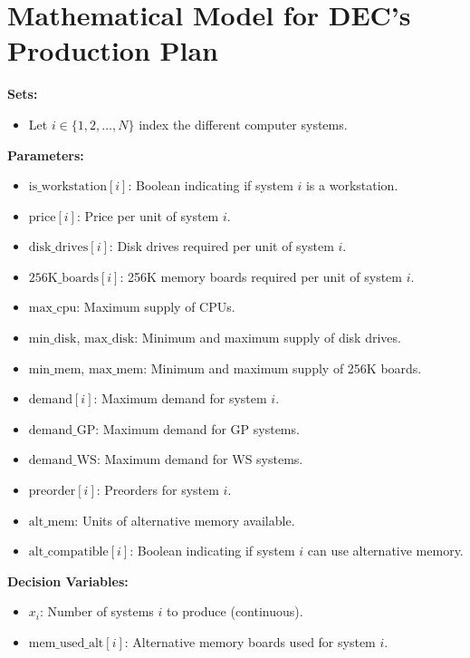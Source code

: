 \documentclass{article}
\begin{document}
\section*{Mathematical Model for DEC's Production Plan}

\textbf{Sets:}
\begin{itemize}
    \item Let \( i \in \{1, 2, \ldots, N\} \) index the different computer systems.
\end{itemize}

\textbf{Parameters:}
\begin{itemize}
    \item \( \text{is\_workstation}[i] \): Boolean indicating if system \( i \) is a workstation.
    \item \( \text{price}[i] \): Price per unit of system \( i \).
    \item \( \text{disk\_drives}[i] \): Disk drives required per unit of system \( i \).
    \item \( \text{256K\_boards}[i] \): 256K memory boards required per unit of system \( i \).
    \item \( \text{max\_cpu} \): Maximum supply of CPUs.
    \item \( \text{min\_disk} \), \( \text{max\_disk} \): Minimum and maximum supply of disk drives.
    \item \( \text{min\_mem} \), \( \text{max\_mem} \): Minimum and maximum supply of 256K boards.
    \item \( \text{demand}[i] \): Maximum demand for system \( i \).
    \item \( \text{demand\_GP} \): Maximum demand for GP systems.
    \item \( \text{demand\_WS} \): Maximum demand for WS systems.
    \item \( \text{preorder}[i] \): Preorders for system \( i \).
    \item \( \text{alt\_mem} \): Units of alternative memory available.
    \item \( \text{alt\_compatible}[i] \): Boolean indicating if system \( i \) can use alternative memory.
\end{itemize}

\textbf{Decision Variables:}
\begin{itemize}
    \item \( x_i \): Number of systems \( i \) to produce (continuous).
    \item \( \text{mem\_used\_alt}[i] \): Alternative memory boards used for system \( i \).
\end{itemize}
\end{document}
